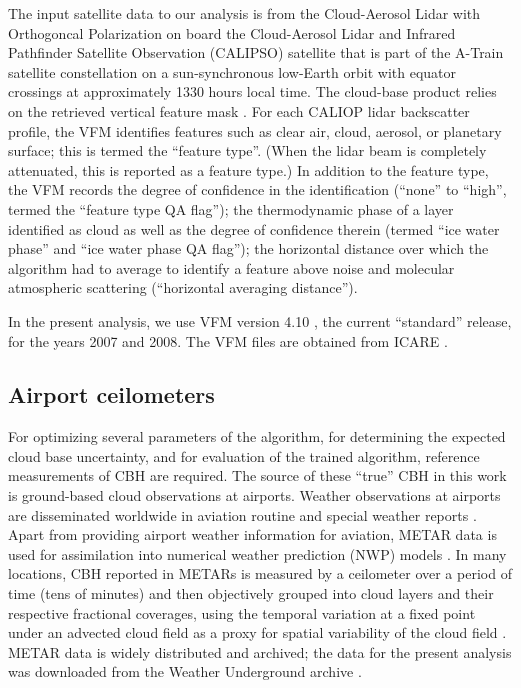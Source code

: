 \documentclass[essd,manuscript]{copernicus}\usepackage[]{graphicx}\usepackage[]{color}
\newcommand{\hlnum}[1]{\textcolor[rgb]{0.686,0.059,0.569}{#1}}%
\newcommand\comment[2]{\{\hlnum{ \textit{#1}: #2}\}}
\newcommand\commentjm[1]{\comment{$j_\mu$}{#1}}
\begin{document}
The input satellite data to our analysis is from the Cloud-Aerosol Lidar with
Orthogoncal Polarization \cite[CALIOP][]{Winker2007} on board the Cloud-Aerosol Lidar and Infrared Pathfinder
Satellite Observation (CALIPSO) satellite that is part of the A-Train
satellite constellation \citep{Stephens2002} on a
sun-synchronous low-Earth orbit with equator crossings at approximately 1330 hours local
time. The cloud-base product relies on the retrieved vertical feature mask
\citep[VFM,][]{vaughan2002}.  For each CALIOP lidar backscatter profile, the VFM identifies features
such as clear air, cloud, aerosol, or planetary surface; this is termed the ``feature
type''.  (When the lidar beam is completely attenuated, this is reported as a
feature type.)  In addition to the feature type, the VFM records the degree of
confidence in the identification (``none'' to ``high'', termed the ``feature
type QA flag''); the thermodynamic phase of a layer identified as cloud as well
as the degree of confidence therein (termed ``ice water phase'' and ``ice water
phase QA flag''); the horizontal distance over which the algorithm had to
average to identify a feature above noise and molecular atmospheric scattering
(``horizontal averaging distance'').  

In the present analysis, we use VFM version 4.10 \citep{vfm}, the current
``standard'' release, for the years 2007 and 2008.  The VFM files are obtained
from ICARE \citep{icare}.

\subsection{Airport ceilometers}





For optimizing several parameters of the algorithm, for determining the expected
cloud base uncertainty, and for evaluation of the trained algorithm, reference
measurements of CBH are required.  The source of these ``true'' CBH in this work
is ground-based cloud observations at airports.  Weather observations at
airports are disseminated worldwide in aviation routine and special weather
reports \citep[METARs and SPECIs, collectively referred to as METARs
henceforth,][]{metar}.  Apart from providing airport weather information for
aviation, METAR data is used for assimilation into numerical weather prediction
(NWP) models \citep[e.g.,][]{Benjamin2016, Dee2011}.  In many locations, CBH
reported in METARs is measured by a ceilometer over a period of time (tens of
minutes) and then objectively grouped into cloud layers and their respective
fractional coverages, using the temporal variation at a fixed point under an
advected cloud field as a proxy for spatial variability of the cloud field
\citep[e.g.,][]{Heese2010}.  METAR data is widely distributed and archived; the
data for the present analysis was downloaded from the Weather Underground
archive \citep{wunderground}.
\end{document}
